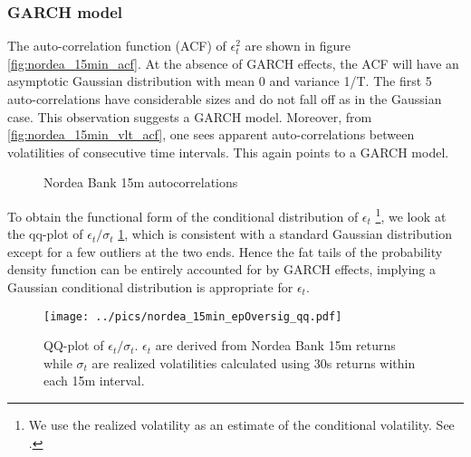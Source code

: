 \documentclass{book}
\begin{document}
\subsubsection{GARCH model}
The auto-correlation function (ACF) of $\epsilon_t^2$ are shown in figure
\ref{fig:nordea_15min_acf}. At the absence of GARCH effects, the ACF
will have an asymptotic Gaussian distribution with mean 0 and variance
1/T. The first 5 auto-correlations have considerable sizes and do not
fall off as in the Gaussian case. This observation suggests a GARCH
model. Moreover, from \ref{fig:nordea_15min_vlt_acf}, one sees
apparent auto-correlations between volatilities of consecutive time
intervals. This again points to a GARCH model.
\begin{figure}[htb!]
  \centering
  \caption{Nordea Bank 15m autocorrelations}
\end{figure}

To obtain the functional form of the conditional distribution of
$\epsilon_t$ \footnote{We use the realized volatility as an estimate of the
conditional volatility. See \cite{Andersen03}.}, we look at the
qq-plot of $\epsilon_t/\sigma_t$ \ref{fig:nordea_15min_epOversig_qq},
which is consistent with a standard Gaussian distribution except for a
few outliers at the two ends. Hence the fat tails of the probability
density function can be entirely accounted for by GARCH effects,
implying a Gaussian conditional distribution is appropriate for $\epsilon_t$.
\begin{figure}[htb!]
  \centering
    \texttt{[image: ../pics/nordea\_15min\_epOversig\_qq.pdf]}
  \caption{QQ-plot of $\epsilon_t / \sigma_t$. $\epsilon_t$ are
    derived from Nordea Bank 15m returns while $\sigma_t$ are realized
    volatilities calculated using 30s returns within each 15m
    interval.}
  \label{fig:nordea_15min_epOversig_qq}
\end{figure}
\end{document}
